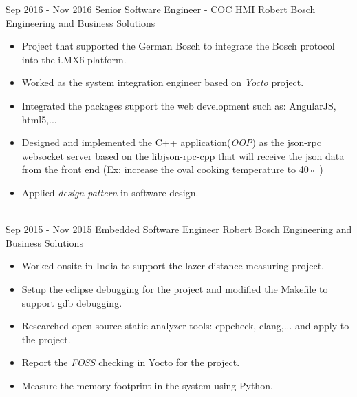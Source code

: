 \documentclass[letterpaper]{twentysecondcv} %
\begin{document}
\begin{twenty}
	\twentyitem
    	{Sep 2016 -}
		{Nov 2016}
        {Senior Software Engineer - COC HMI}
        {{Robert Bosch Engineering and Business Solutions}}
        {}
        {\begin{itemize}
        \item Project that supported the German Bosch to integrate the Bosch protocol into the i.MX6
        platform.
        \item Worked as the system integration engineer based on \textit{Yocto} project.
        \item Integrated the packages support the web development such as: AngularJS, html5,...
        \item Designed and implemented the C++ application(\textit{OOP}) as the json-rpc websocket server based
        on the \href{https://github.com/cinemast/libjson-rpc-cpp}{libjson-rpc-cpp} that will receive the json data from the front end (Ex: increase the oval cooking temperature to 40◦ )
        \item Applied \textit{design pattern} in software design.
        \end{itemize}}
        \\
	\twentyitem
    	{Sep 2015 -}
		{Nov 2015}
        {Embedded Software Engineer}
        {{Robert Bosch Engineering and Business Solutions}}
        {}
        {
        {\begin{itemize}
        \item Worked onsite in India to support the lazer distance measuring project.
        \item Setup the eclipse debugging for the project and modified the Makefile to support gdb
        debugging.
        \item Researched open source static analyzer tools: cppcheck, clang,... and apply to the project.
        \item Report the \textit{FOSS} checking in Yocto for the project.
        \item Measure the memory footprint in the system using Python.
	    \end{itemize}}
        }
\end{twenty}

\newpage
\makeprofile
\end{document}
